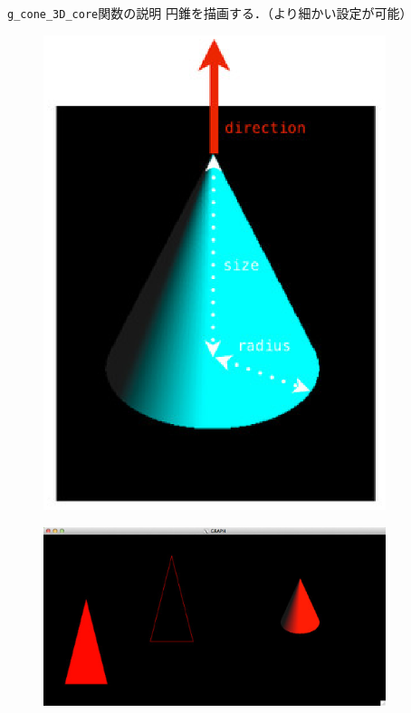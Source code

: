 \documentclass[a4paper,12pt]{jsarticle}%
\begin{document}
\begin{itembox}[l]{\texttt{g\_cone\_3D\_core}関数の説明}
円錐を描画する．（より細かい設定が可能）
\end{itembox}
\begin{figure}[htb]
	\includegraphics[width=100mm]{./Figures/eps/Canvas_g_cone.eps}
\end{figure}

\begin{figure}[htb]
	\includegraphics[width=100mm]{./Figures/eps/Canvas_g_cone2.eps}
\end{figure}
\end{document}
